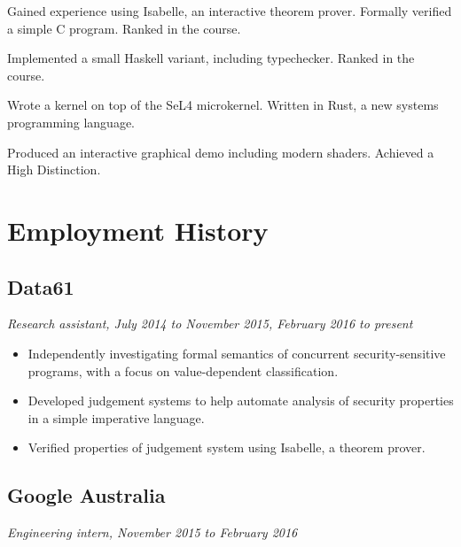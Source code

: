 \documentclass{article}
\begin{document}
\begin{multicols*}{2}
\begin{description}[leftmargin=12pt, itemsep=-2pt]
 \item[Advanced Algorithmic Verification:] {
  Gained experience using Isabelle, an interactive theorem prover. Formally verified a simple C program. Ranked  in the course.
 }
 \item[Concepts of Programming Languages:] {
  Implemented a small Haskell variant, including typechecker. Ranked  in the course.
 }
 \item[Advanced Operating Systems:] {
  Wrote a kernel on top of the SeL4 microkernel. Written in Rust, a new systems programming language.
 }
 \item[Computer Graphics:] {
  Produced an interactive graphical demo including modern shaders. Achieved a High Distinction.
 }
 
\end{description}

\nocite{*}
\printbibliography[title=Publications]

\vfill

\section*{Employment History}

\subsection*{Data61}
\textit{Research assistant, July 2014 to November 2015, February 2016 to present}

\begin{itemize}[leftmargin=12pt, itemsep=-2pt, topsep=-4pt]
 \item {
  Independently investigating formal semantics of concurrent security-sensitive programs, with a focus on value-dependent classification.
 }
 \item {
  Developed judgement systems to help automate analysis of security properties in a simple imperative language.
 }
 \item {
  Verified properties of judgement system using Isabelle, a theorem prover.
 }
\end{itemize}

\subsection*{Google Australia}
\textit{Engineering intern, November 2015 to February 2016}


\end{multicols*}
\end{document}
